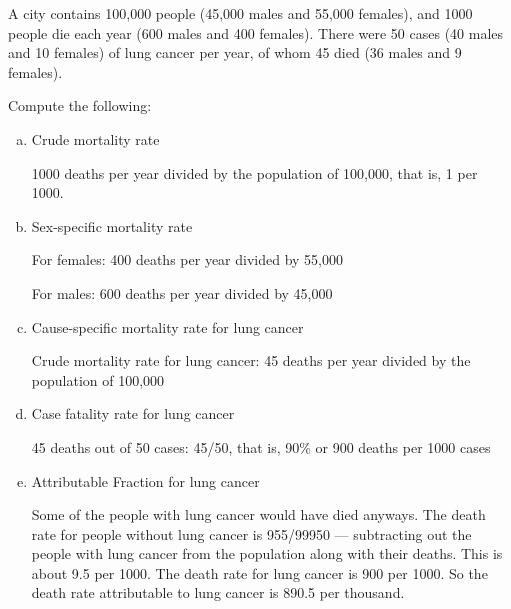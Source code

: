 
A city contains 100,000 people (45,000 males and 55,000 females), and
1000 people die each year (600 males and 400 females).  There were 50
cases (40 males and 10 females) of lung cancer per year, of whom 45
died (36 males and 9 females). 

Compute the following:
\begin{enumerate}[(a)]

\item Crude mortality rate
\begin{AnswerText}
1000 deaths per year divided by the population of 100,000, that is,  1 per 1000.
\end{AnswerText}

\item Sex-specific mortality rate
\begin{AnswerText}
For females: 400 deaths per year divided by 55,000

For males: 600 deaths per year divided by 45,000
\end{AnswerText}

\item Cause-specific mortality rate for lung cancer
\begin{AnswerText}
Crude mortality rate for lung cancer: 45 deaths per year divided by
the population of  100,000
\end{AnswerText}

\item Case fatality rate for lung cancer
\begin{AnswerText}
45 deaths out of 50 cases: 45/50, that is, 90\% or 900 deaths per 1000 cases
\end{AnswerText}

\item Attributable Fraction for lung cancer
\begin{AnswerText}
Some of the people with lung cancer would have died anyways.  The
death rate for people without lung cancer is 955/99950 --- subtracting
out the people with lung cancer from the population along with their
deaths.  This is about 9.5 per 1000.  The death rate for lung cancer
is 900 per 1000.  So the death rate attributable to lung cancer is 890.5
per thousand.

\end{AnswerText}

\end{enumerate}

